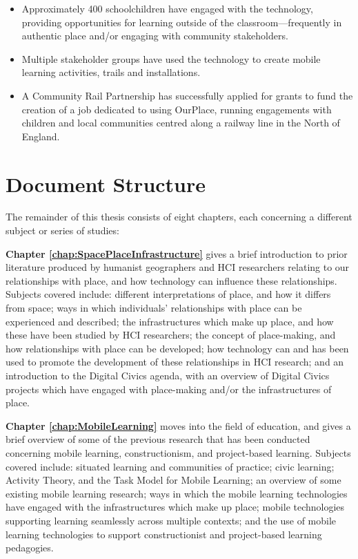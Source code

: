 \begin{itemize}
    \begin{itemize}
    \item Approximately 400 schoolchildren have engaged with the technology, providing opportunities for learning outside of the classroom---frequently in authentic place and/or engaging with community stakeholders.
    \item Multiple stakeholder groups have used the technology to create mobile learning activities, trails and installations.
    \item A Community Rail Partnership has successfully applied for grants to fund the creation of a job dedicated to using OurPlace, running engagements with children and local communities centred along a railway line in the North of England.
    \end{itemize}
\end{itemize}

\section{Document Structure}

The remainder of this thesis consists of eight chapters, each concerning a different subject or series of studies: 

\textbf{Chapter \ref{chap:SpacePlaceInfrastructure}} gives a brief introduction to prior literature produced by humanist geographers and HCI researchers relating to our relationships with place, and how technology can influence these relationships. Subjects covered include: different interpretations of place, and how it differs from space; ways in which individuals' relationships with place can be experienced and described; the infrastructures which make up place, and how these have been studied by HCI researchers; the concept of place-making, and how relationships with place can be developed; how technology can and has been used to promote the development of these relationships in HCI research; and an introduction to the Digital Civics agenda, with an overview of Digital Civics projects which have engaged with place-making and/or the infrastructures of place.

\textbf{Chapter \ref{chap:MobileLearning}} moves into the field of education, and gives a brief overview of some of the previous research that has been conducted concerning mobile learning, constructionism, and project-based learning. Subjects covered include: situated learning and communities of practice; civic learning; Activity Theory, and the Task Model for Mobile Learning; an overview of some existing mobile learning research; ways in which the mobile learning technologies have engaged with the infrastructures which make up place; mobile technologies supporting learning seamlessly across multiple contexts; and the use of mobile learning technologies to support constructionist and project-based learning pedagogies.

